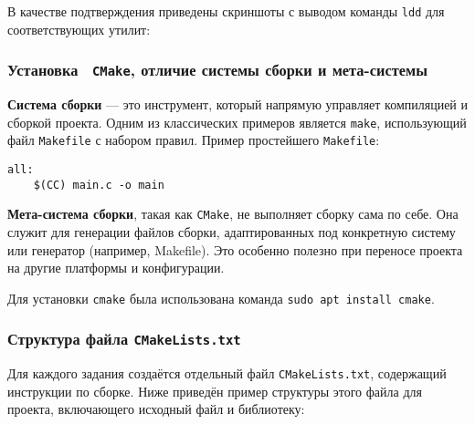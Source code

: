 В качестве подтверждения приведены скриншоты с выводом команды \texttt{ldd} для соответствующих утилит:






\subsubsection*{Установка  \texttt{CMake}, отличие системы сборки и мета-системы}

\textbf{Система сборки} — это инструмент, который напрямую управляет компиляцией и сборкой проекта. Одним из классических примеров является \texttt{make}, использующий файл \texttt{Makefile} с набором правил. Пример простейшего \texttt{Makefile}:

\begin{verbatim}
all:
	$(CC) main.c -o main
\end{verbatim}

\textbf{Мета-система сборки}, такая как \texttt{CMake}, не выполняет сборку сама по себе. Она служит для генерации файлов сборки, адаптированных под конкретную систему или генератор (например, Makefile). Это особенно полезно при переносе проекта на другие платформы и конфигурации.

Для установки \texttt{cmake} была использована команда \texttt{sudo apt install cmake}.


\subsubsection*{Структура файла \texttt{CMakeLists.txt}}

Для каждого задания создаётся отдельный файл \texttt{CMakeLists.txt}, содержащий инструкции по сборке. Ниже приведён пример структуры этого файла для проекта, включающего исходный файл и библиотеку:

